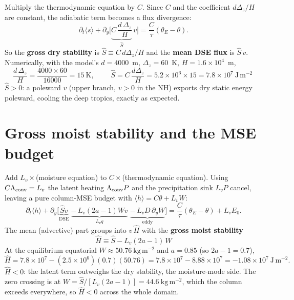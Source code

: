 \documentclass[11pt]{article}
\newcommand{\py}{\partial_y}
\newcommand{\Shat}{\hat S}
\newcommand{\Hhat}{\hat H}
\newcommand{\col}[1]{\langle #1\rangle}
\begin{document}
Multiply the thermodynamic equation by $C$. Since $C$ and the coefficient
$d\Delta_z/H$ are constant, the adiabatic term becomes a flux divergence:
\begin{equation}
\partial_t\col{s} + \py\!\Big[\underbrace{C\,\frac{d\,\Delta_z}{H}}_{\displaystyle \Shat}\,v\Big]
= \frac{C}{\tau}(\theta_E-\theta).
\end{equation}
So the \textbf{gross dry stability} is $\Shat \equiv C\,d\Delta_z/H$ and the
\textbf{mean DSE flux} is $\Shat\,v$. Numerically, with the model's
$d=4000$~m, $\Delta_z=60$~K, $H=1.6\times10^{4}$~m,
\begin{equation}
\frac{d\,\Delta_z}{H}=\frac{4000\times60}{16000}=15~\mathrm{K},
\qquad
\boxed{\;\Shat = C\,\frac{d\Delta_z}{H}=5.2\times10^{6}\times15
      = 7.8\times10^{7}~\mathrm{J\,m^{-2}}\;}
\end{equation}
$\Shat>0$: a poleward $v$ (upper branch, $v>0$ in the NH) exports dry static
energy poleward, cooling the deep tropics, exactly as expected.

\section{Gross moist stability and the MSE budget}

Add $L_v\times$(moisture equation) to $C\times$(thermodynamic equation). Using
$C\Lambda_{\rm conv}=L_v$ the latent heating $\Lambda_{\rm conv}P$ and the
precipitation sink $L_v P$ cancel, leaving a pure column-MSE budget with
$\col{h}=C\theta+L_v W$:
\begin{equation}
\partial_t\col{h}
+\py\!\Big[\underbrace{\Shat v}_{\text{DSE}}
\;\underbrace{-\,L_v(2a{-}1)Wv}_{L_v q}
\;\underbrace{-\,L_v D\,\py W}_{\text{eddy}}\Big]
= \frac{C}{\tau}(\theta_E-\theta) + L_v E_0 .
\end{equation}
The mean (advective) part groups into $v\,\Hhat$ with the \textbf{gross moist
stability}
\begin{equation}
\boxed{\;\Hhat \equiv \Shat - L_v(2a{-}1)\,W\;}
\end{equation}
At the equilibrium equatorial $W\approx50.76~\mathrm{kg\,m^{-2}}$ and $a=0.85$
(so $2a-1=0.7$),
\begin{equation}
\Hhat = 7.8\times10^{7} - (2.5\times10^{6})(0.7)(50.76)
      = 7.8\times10^{7} - 8.88\times10^{7}
      = -1.08\times10^{7}~\mathrm{J\,m^{-2}} .
\end{equation}
$\Hhat<0$: the latent term outweighs the dry stability, the moisture-mode side.
The zero crossing is at $W=\Shat/[L_v(2a{-}1)]=44.6~\mathrm{kg\,m^{-2}}$, which the
column exceeds everywhere, so $\Hhat<0$ across the whole domain.
\end{document}
